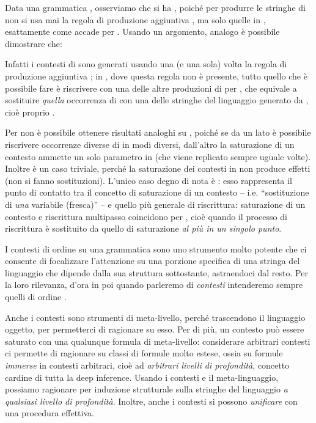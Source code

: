 \documentclass[12pt,a4paper,openright,twoside]{report}
\begin{document}
Data una grammatica , osserviamo che si ha , poich\'e per produrre le stringhe di  non si usa mai la regola di produzione aggiuntiva , ma solo quelle in , esattamente come accade per . Usando un argomento, analogo \`e possibile dimostrare che:

Infatti i contesti di  sono generati usando una (e una sola) volta la regola di produzione aggiuntiva ; in , dove questa regola non \`e presente, tutto quello che \`e possibile fare \`e riscrivere  con una delle altre produzioni di  per , che equivale a sostituire \emph{quella} occorrenza di  con una delle stringhe del linguaggio generato da , cio\`e proprio .

Per  non \`e possibile ottenere risultati analoghi su , poich\'e se da un lato \`e possibile riscrivere occorrenze diverse di  in modi diversi, dall'altro la saturazione di un contesto ammette un solo parametro in  (che viene replicato sempre uguale  volte). Inoltre  \`e un caso triviale, perch\'e la saturazione dei contesti in  non produce effetti (non si fanno sostituzioni). L'unico caso degno di nota \`e : esso rappresenta il punto di contatto tra il concetto di saturazione di un contesto -- i.e. ``sostituzione di \emph{una} variabile (fresca)'' -- e quello pi\`u generale di riscrittura: saturazione di un contesto e riscrittura multipasso coincidono per , cio\`e quando il processo di riscrittura \`e sostituito da quello di saturazione \emph{al pi\`u in un singolo punto}.

I contesti di ordine  su una grammatica sono uno strumento molto potente che ci consente di focalizzare l'attenzione su una porzione specifica di una stringa del linguaggio che dipende dalla sua struttura sottostante, astraendoci dal resto. Per la loro rilevanza, d'ora in poi quando parleremo di \emph{contesti} intenderemo sempre quelli di ordine . 

Anche i contesti sono strumenti di meta-livello, perch\'e trascendono il linguaggio oggetto, per permetterci di ragionare su esso. Per di pi\`u, un contesto pu\`o essere saturato con una qualunque formula di meta-livello: considerare arbitrari contesti ci permette di ragionare su classi di formule molto estese, ossia su formule \emph{immerse} in contesti arbitrari, cio\`e ad \emph{arbitrari livelli di profondit\`a}, concetto cardine di tutta la deep inference. Usando i contesti e il meta-linguaggio, possiamo ragionare per induzione strutturale sulla stringhe del linguaggio \emph{a qualsiasi livello di profondit\`a}. Inoltre, anche i contesti si possono \emph{unificare} con una procedura effettiva.
\end{document}
